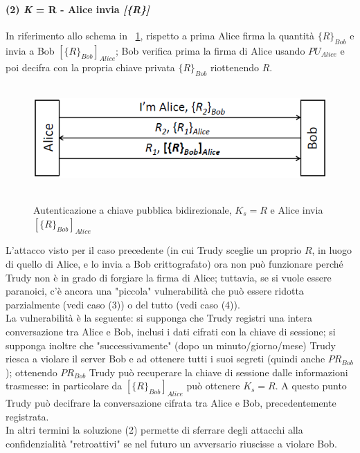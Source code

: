 \paragraph{(2) \textit{K} = R - Alice invia \textit{[\{R\}]}}
In riferimento allo schema in \figurename~\ref{fig:ImgS69bis}, rispetto a prima Alice firma la quantità $\lbrace R\rbrace_{Bob}$ e invia a Bob $[\lbrace R\rbrace_{Bob}]_{Alice}$; Bob verifica prima la firma di Alice usando $PU_{Alice}$ e poi decifra con la propria chiave privata $\lbrace R\rbrace_{Bob}$ riottenendo $R$.
\begin{figure}[htbp]
	\centering%
	\subfigure%
	{\includegraphics[height=4cm, width=12cm, keepaspectratio]{Immagini/autenticazione/ImgS69bis.png}}
	\caption{Autenticazione a chiave pubblica bidirezionale, $K_{s} = R$ e Alice invia $[\lbrace R\rbrace_{Bob}]_{Alice}$}\label{fig:ImgS69bis} 	
\end{figure}
L'attacco visto per il caso precedente (in cui Trudy sceglie un proprio $R$, in luogo di quello di Alice, e lo invia a Bob crittografato) ora non può funzionare perché Trudy non è in grado di forgiare la firma di Alice; tuttavia, se si vuole essere paranoici, c'è ancora una "piccola" vulnerabilità che può essere ridotta parzialmente (vedi caso (3)) o del tutto (vedi caso (4)). \\
La vulnerabilità è la seguente: si supponga che Trudy registri una intera conversazione tra Alice e Bob, inclusi i dati cifrati con la chiave di sessione; si supponga inoltre che "successivamente" (dopo un minuto/giorno/mese) Trudy riesca a violare il server Bob e ad ottenere tutti i suoi segreti (quindi anche $PR_{Bob}$); ottenendo $PR_{Bob}$ Trudy può recuperare la chiave di sessione dalle informazioni trasmesse: in particolare da $[\lbrace R\rbrace_{Bob}]_{Alice}$ può ottenere $K_{s} = R$. A questo punto Trudy può decifrare la conversazione cifrata tra Alice e Bob, precedentemente registrata.\\
In altri termini la soluzione (2) permette di sferrare degli attacchi alla confidenzialità "retroattivi" se nel futuro un avversario riuscisse a violare Bob.
